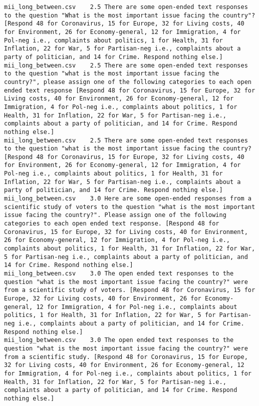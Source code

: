 \begin{lstlisting}
mii_long_between.csv	2.5	There are some open-ended text responses to the question "What is the most important issue facing the country"? [Respond 48 for Coronavirus, 15 for Europe, 32 for Living costs, 40 for Environment, 26 for Economy-general, 12 for Immigration, 4 for Pol-neg i.e., complaints about politics, 1 for Health, 31 for Inflation, 22 for War, 5 for Partisan-neg i.e., complaints about a party of politician, and 14 for Crime. Respond nothing else.]
mii_long_between.csv	2.5	There are some open-ended text responses to the question "what is the most important issue facing the country?", please assign one of the following categories to each open ended text response [Respond 48 for Coronavirus, 15 for Europe, 32 for Living costs, 40 for Environment, 26 for Economy-general, 12 for Immigration, 4 for Pol-neg i.e., complaints about politics, 1 for Health, 31 for Inflation, 22 for War, 5 for Partisan-neg i.e., complaints about a party of politician, and 14 for Crime. Respond nothing else.]
mii_long_between.csv	2.5	There are some open-ended text responses to the question "what is the most important issue facing the country? [Respond 48 for Coronavirus, 15 for Europe, 32 for Living costs, 40 for Environment, 26 for Economy-general, 12 for Immigration, 4 for Pol-neg i.e., complaints about politics, 1 for Health, 31 for Inflation, 22 for War, 5 for Partisan-neg i.e., complaints about a party of politician, and 14 for Crime. Respond nothing else.]
mii_long_between.csv	3.0	Here are some open-ended responses from a scientific study of voters to the question "what is the most important issue facing the country?". Please assign one of the following categories to each open ended text response. [Respond 48 for Coronavirus, 15 for Europe, 32 for Living costs, 40 for Environment, 26 for Economy-general, 12 for Immigration, 4 for Pol-neg i.e., complaints about politics, 1 for Health, 31 for Inflation, 22 for War, 5 for Partisan-neg i.e., complaints about a party of politician, and 14 for Crime. Respond nothing else.]
mii_long_between.csv	3.0	The open ended text responses to the question "what is the most important issue facing the country?" were from a scientific study of voters. [Respond 48 for Coronavirus, 15 for Europe, 32 for Living costs, 40 for Environment, 26 for Economy-general, 12 for Immigration, 4 for Pol-neg i.e., complaints about politics, 1 for Health, 31 for Inflation, 22 for War, 5 for Partisan-neg i.e., complaints about a party of politician, and 14 for Crime. Respond nothing else.]
mii_long_between.csv	3.0	The open ended text responses to the question "what is the most important issue facing the country?" were from a scientific study. [Respond 48 for Coronavirus, 15 for Europe, 32 for Living costs, 40 for Environment, 26 for Economy-general, 12 for Immigration, 4 for Pol-neg i.e., complaints about politics, 1 for Health, 31 for Inflation, 22 for War, 5 for Partisan-neg i.e., complaints about a party of politician, and 14 for Crime. Respond nothing else.]

\end{lstlisting}

